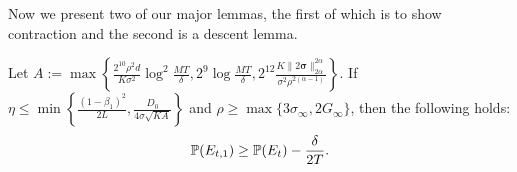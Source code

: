 \documentclass{article} %
\numberwithin{equation}{section}
\begin{document}
Now we present two of our major lemmas, the first of which is to show contraction and the second is a descent lemma.

\begin{lemma}\label{lem:contraction_sgdm}
    Let $A:=\max\left\{\frac{2^{10}\rho^2d}{K\sigma^2}\log^2\frac{MT}{\delta}, 2^9\log\frac{MT}{\delta}, 2^{12}\frac{K\|2\boldsymbol{\sigma}\|_{2\alpha}^{2\alpha}}{\sigma^2\rho^{2(\alpha-1)}} \right\}$. If $\eta\leq \min\left\{\frac{(1-\beta_1)^2}{2L}, \frac{D_0}{4\sigma\sqrt{KA}}\right\}$ and $\rho\geq\max\{3\sigma_\infty, 2G_\infty\}$, then the following holds:
    \begin{equation}
        \mathbb{P}(E_{t,1})\geq \mathbb{P}(E_t)-\frac{\delta}{2T}.
    \end{equation}
\end{lemma}
\end{document}
